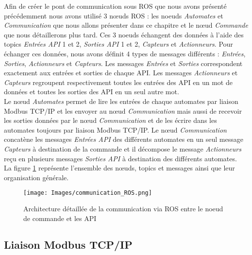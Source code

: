 \documentclass[a4paper,french, titlepage]{book}
\begin{document}
Afin de créer le pont de communication sous ROS que nous avons présenté précédemment nous avons utilisé 3 nœuds ROS : les noeuds \emph{Automates} et \emph{Communication} que nous allons présenter dans ce chapitre et le nœud \emph{Commande} que nous détaillerons plus tard. Ces 3 noeuds échangent des données à l'aide des topics \emph{Entrées API} 1 et 2, \emph{Sorties API} 1 et 2, \emph{Capteurs} et \emph{Actionneurs}. Pour échanger ces données, nous avons définit 4 types de messages différents : \emph{Entrées}, \emph{Sorties}, \emph{Actionneurs} et \emph{Capteurs}. Les messages \emph{Entrées} et \emph{Sorties} correspondent exactement aux entrées et sorties de chaque API. Les messages \emph{Actionneurs} et \emph{Capteurs} regroupent respectivement toutes les entrées des API en un mot de données et toutes les sorties des API en un seul autre mot.\\

Le nœud \emph{Automates} permet de lire les entrées de chaque automates par liaison Modbus TCP/IP et les envoyer au nœud \emph{Communication} mais aussi de recevoir les sorties données par le nœud \emph{Communication} et de les écrire dans les automates toujours par liaison Modbus TCP/IP. Le nœud \emph{Communication} concatène les messages \emph{Entrées API} des différents automates en un seul message \emph{Capteurs} à destination de la commande et il décompose le message \emph{Actionneurs} reçu en plusieurs messages \emph{Sorties API} à destination des différents automates.\\

La figure \ref{schema_detail} représente l'ensemble des nœuds, topics et messages ainsi que leur organisation générale.\\

\vspace{1.5cm}

\begin{figure}[H] 
\begin{center}
\texttt{[image: Images/communication\_ROS.png]} 
\end{center}
\caption{Architecture détaillée de la communication via ROS entre le noeud de commande et les API}
\label{schema_detail}
\end{figure}

\newpage
\subsection{Liaison Modbus TCP/IP\label{section_modbus}}
\end{document}
